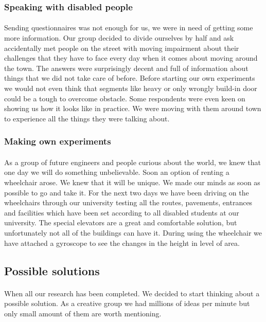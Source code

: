 \documentclass[12pt]{article}
\begin{document}
\subsubsection{Speaking with disabled people}
\paragraph{}Sending questionnaires was not enough for us, we were in need of getting some more information. Our group decided to divide ourselves by half and ask accidentally met people on the street with moving impairment about their challenges that they have to face every day when it comes about moving around the town. The answers were surprisingly decent and full of information about things that we did not take care of before. Before starting our own experiments we would not even think that segments like heavy or only wrongly build-in door could be a tough to overcome obstacle. Some respondents were even keen on showing us how it looks like in practice. We were moving with them around town to experience all the things they were talking about. 
\subsubsection{Making own experiments}
\paragraph{}As a group of future engineers and people curious about the world, we knew that one day we will do something unbelievable. Soon an option of renting a wheelchair arose. We knew that it will be unique. We made our minds as soon as possible to go and take it. For the next two days we have been driving on the wheelchairs through our university testing all the routes, pavements, entrances and facilities which have been set according to all disabled students at our university. The special elevators are a great and comfortable solution, but unfortunately not all of the buildings can have it. During using the wheelchair we have attached a gyroscope to see the changes in the height in level of area.   

\subsection{Possible solutions}
\paragraph{}When all our research has been completed. We decided to start thinking about a possible solution. As a creative group we had millions of ideas per minute but only small amount of them are worth mentioning. 
\end{document}
